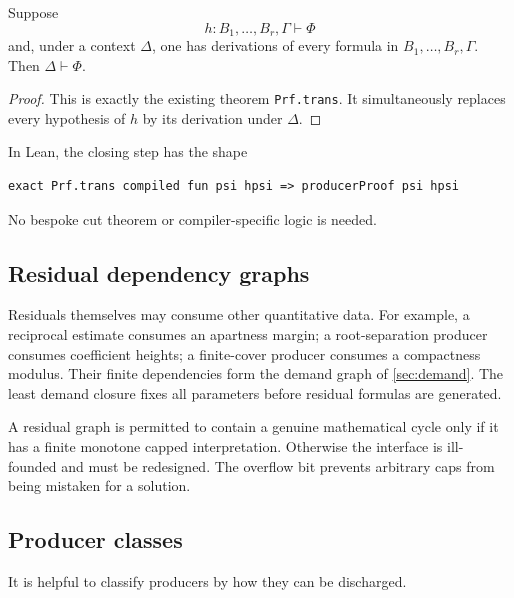 \begin{theorem}
\label{thm:residual-closure}
Suppose
\[
  h:B_1,\ldots,B_r,\Gamma\vdash\Phi
\]
and, under a context \(\Delta\), one has derivations of every formula in \(B_1,\ldots,B_r,\Gamma\).  Then \(\Delta\vdash\Phi\).
\end{theorem}

\begin{proof}
This is exactly the existing theorem \texttt{Prf.trans}.  It simultaneously replaces every hypothesis of \(h\) by its derivation under \(\Delta\).
\end{proof}

In Lean, the closing step has the shape
\begin{lstlisting}[language={}] 
exact Prf.trans compiled fun psi hpsi => producerProof psi hpsi
\end{lstlisting}
No bespoke cut theorem or compiler-specific logic is needed.

\subsection{Residual dependency graphs}

Residuals themselves may consume other quantitative data.  For example, a reciprocal estimate consumes an apartness margin; a root-separation producer consumes coefficient heights; a finite-cover producer consumes a compactness modulus.  Their finite dependencies form the demand graph of \cref{sec:demand}.  The least demand closure fixes all parameters before residual formulas are generated.

A residual graph is permitted to contain a genuine mathematical cycle only if it has a finite monotone capped interpretation.  Otherwise the interface is ill-founded and must be redesigned.  The overflow bit prevents arbitrary caps from being mistaken for a solution.

\subsection{Producer classes}

It is helpful to classify producers by how they can be discharged.

